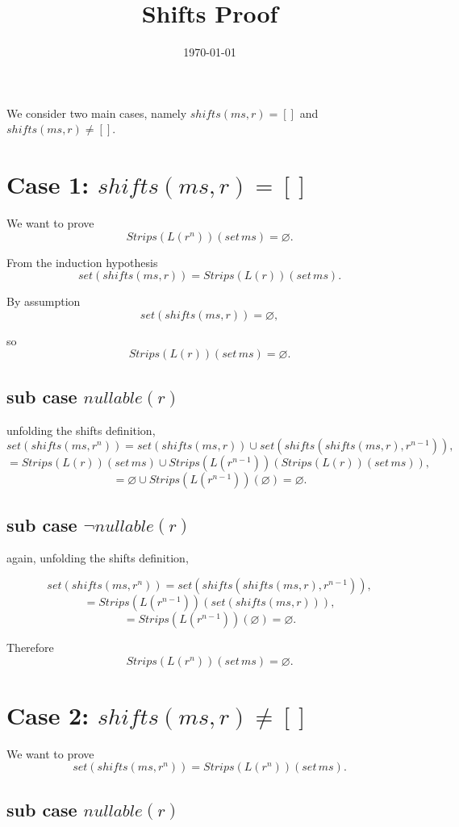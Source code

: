 \documentclass[12pt]{article}
\title{Shifts Proof}
\date{\today}
\begin{document}
\maketitle

We consider two main cases, namely $shifts(ms,r)= []$ and $shifts(ms,r)\neq []$.
\section{Case 1: $shifts(ms,r) = []$}


We want to prove
\[
Strips(L(r^n))(set\,ms) = \varnothing.
\]

From the induction hypothesis 
\[
set(shifts(ms,r)) = Strips(L(r))(set\,ms).
\]

By assumption
\[
set(shifts(ms,r)) = \varnothing,
\]

so
\[
Strips(L(r))(set\,ms) = \varnothing.
\]

\subsection{sub case $nullable(r)$}
unfolding the shifts definition,
\[
set(shifts(ms,r^n)) = set(shifts(ms,r)) \cup set(shifts(shifts(ms,r),r^{n-1})),
\]
\[
= Strips(L(r))(set\,ms) \cup Strips(L(r^{n-1}))(Strips(L(r))(set\,ms)),
\]
\[
= \varnothing \cup Strips(L(r^{n-1}))(\varnothing) = \varnothing.
\]

\subsection{sub case $\neg nullable(r)$}
again, unfolding the shifts definition,

\[
set(shifts(ms,r^n)) = set(shifts(shifts(ms,r),r^{n-1})),
\]
\[
= Strips(L(r^{n-1}))(set(shifts(ms,r))),
\]
\[
= Strips(L(r^{n-1}))(\varnothing) = \varnothing.
\]

Therefore
\[
Strips(L(r^n))(set\,ms) = \varnothing.
\]

\newpage

\section{Case 2: $shifts(ms,r) \neq []$}

We want to prove
\[
set(shifts(ms,r^n)) = Strips(L(r^n))(set\,ms).
\]

\subsection{sub case $nullable(r)$}
\end{document}
